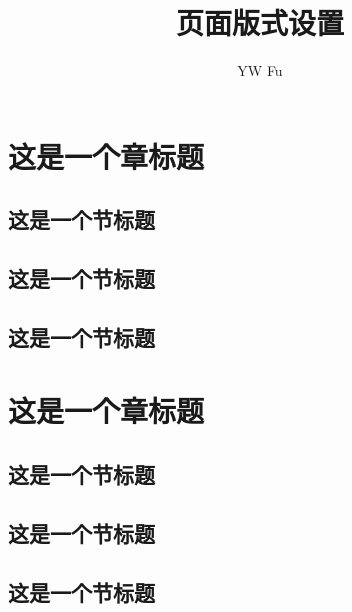 \documentclass[12pt,a5paper,twoside]{ctexbook}
\author{YW Fu}
\title{页面版式设置}
\begin{document}
	\maketitle
	\chapter{这是一个章标题}
	\section{这是一个节标题}
	\lipsum[1]
	\section{这是一个节标题}
	\lipsum[2]
	\section{这是一个节标题}
	\lipsum[3]
	\chapter{这是一个章标题}
	\section{这是一个节标题}
	\lipsum[4]
	\section{这是一个节标题}
	\lipsum[5]
	\section{这是一个节标题}
	\lipsum[6]
\end{document}
